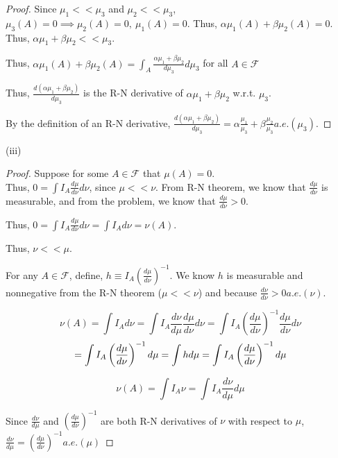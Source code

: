 \documentclass[12pt,letterpaper, onecolumn]{exam}
\newcommand{\calF}{\mathcal{F}}
\begin{document}
\begin{questions}
\begin{solution}
\begin{proof}
            Since $\mu_1 << \mu_3$ and $\mu_2 << \mu_3$, $\mu_3(A) = 0 \implies \mu_2(A) = 0, \: \mu_1(A) = 0$. Thus, $\alpha \mu_1(A) + \beta \mu_2(A) = 0$. Thus, $\alpha \mu_1 + \beta \mu_2 << \mu_3$.

            Thus, $\alpha\mu_1(A) + \beta \mu_2(A) = \int_A \frac{\alpha\mu_1 + \beta \mu_2}{d \mu_3} d \mu_3$ for all $A \in \calF$

            Thus, $\frac{d(\alpha\mu_1 + \beta \mu_2)}{d \mu_3}$ is the R-N derivative of $\alpha\mu_1 + \beta \mu_2$ w.r.t. $\mu_3$.

            By the definition of an R-N derivative, $\frac{d(\alpha\mu_1 + \beta \mu_2)}{d \mu_3} = \alpha \frac{\mu_1}{\mu_3}  +  \beta \frac{\mu_2}{\mu_3} a.e.(\mu_3)$.
            \end{proof}

            (iii) \begin{proof}
                
                Suppose for some $A \in \calF$ that $\mu(A) = 0$. \\
                Thus, $0 = \int I_A \frac{d \mu}{d \nu} d\nu$, since $\mu << \nu$. From R-N theorem, we know that $\frac{d \mu}{d \nu}$ is measurable, and from the problem, we know that $\frac{d \mu}{d \nu} > 0$. 

                Thus, $0 = \int I_A \frac{d \mu}{d \nu} d\nu = \int I_A d \nu = \nu(A)$. 

                Thus, $\nu << \mu$.

               For any $A \in \calF$, define, $h \equiv I_A \left(\frac{d \mu}{d\nu}\right)^{-1}$. We know $h$ is measurable and nonnegative from the R-N theorem ($\mu << \nu$) and because $\frac{d \nu}{d\nu} > 0 a.e. (\nu)$.

               \[\nu(A) = \int I_A d \nu = \int I_A \frac{d \nu}{d\mu} \frac{d\mu}{d\nu}d\nu =  \int I_A \left(\frac{d \mu}{d\nu}\right)^{-1} \frac{d\mu}{d\nu}d\nu \]\[= \int I_A \left(\frac{d \mu}{d\nu}\right)^{-1} d\mu \\
               = \int h d \mu = \int I_A \left(\frac{d \mu}{d\nu}\right)^{-1} d\mu\]

               \[\nu(A) = \int I_A \nu = \int I_A \frac{d \nu}{d\mu} d\mu\]
               
                Since $\frac{d \nu}{d\mu}$ and $\left(\frac{d \mu}{d\nu}\right)^{-1}$ are both R-N derivatives of $\nu$ with respect to $\mu$, $\frac{d \nu}{d\mu} = \left(\frac{d \mu}{d\nu}\right)^{-1} a.e.(\mu)$
            \end{proof}


\end{solution}
\end{questions}
\end{document}
